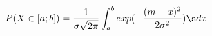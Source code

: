 \documentclass[preview]{standalone}
\begin{document}
\begin{align*}
P( X \in [a;b] ) = { \frac{1}{\sigma \sqrt{2\pi}} } \int_a^b { exp(-{ \frac{(m - x)^2}{2 \sigma^2} }) } \s dx
\end{align*}
\end{document}
